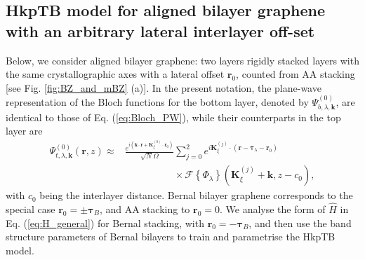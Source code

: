 \documentclass[showpacs,aps,prb,reprint,twocolumn]{revtex4-1}
\begin{document}
\subsection{HkpTB model for aligned bilayer graphene with an arbitrary lateral interlayer off-set}
\label{sec:blg}

Below, we consider aligned bilayer graphene: two layers rigidly stacked layers with the same crystallographic axes with a lateral offset $\boldsymbol{r}_0$, counted from AA stacking [see Fig. \ref{fig:BZ_and_mBZ} (a)]. In the present notation, the plane-wave representation of the Bloch functions for the bottom layer, denoted by $\Psi_{b,\lambda,\boldsymbol{k}}^{(0)}$, are identical to those of Eq. (\ref{eq:Bloch_PW}), while their counterparts in the top layer are
\begin{align}\label{eq:Bloch_PW_t}
\Psi_{t,\lambda,\boldsymbol{k}}^{(0)}(\boldsymbol{r},z) \approx &
\frac{e^{i(\boldsymbol{k}\cdot\boldsymbol{r}+\boldsymbol{K}_\xi^{(0)}\cdot\boldsymbol{r}_0)}}
{\sqrt{N}\Omega}\sum^2_{j=0}
e^{i\boldsymbol{K}^{(j)}_\xi\cdot(\boldsymbol{r} - \boldsymbol{\tau}_{\lambda}-\boldsymbol{r}_0)}\\
&\qquad\qquad\quad\times
\mathcal{F}\left\{\Phi_\lambda\right\}
(\boldsymbol{K}^{(j)}_\xi+\boldsymbol{k},z-c_0),\nonumber 
\end{align}
with $c_0$ being the interlayer distance. Bernal bilayer graphene corresponds to the special case $\boldsymbol{r}_0=\pm\boldsymbol{\tau}_B$, and AA stacking to $\boldsymbol{r}_0=0$. We analyse the form of $\hat{H}$ in Eq. (\ref{eq:H_general}) for Bernal stacking, with $\boldsymbol{r}_0=-\boldsymbol{\tau}_B$, and then use the band structure parameters of Bernal bilayers \cite{Slonczewski_1958, McClure_1957, McClure_1960} to train and parametrise the HkpTB model.
\end{document}
